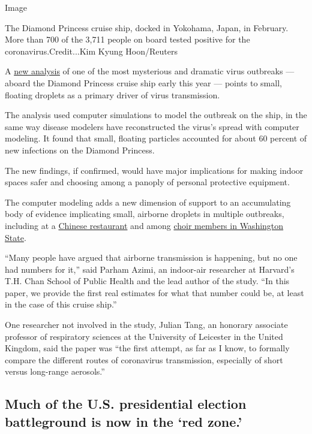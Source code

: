 Image

The Diamond Princess cruise ship, docked in Yokohama, Japan, in
February. More than 700 of the 3,711 people on board tested positive for
the coronavirus.Credit...Kim Kyung Hoon/Reuters

A
\href{https://www.medrxiv.org/content/10.1101/2020.07.13.20153049v1}{new
analysis} of one of the most mysterious and dramatic virus outbreaks ---
aboard the Diamond Princess cruise ship early this year --- points to
small, floating droplets as a primary driver of virus transmission.

The analysis used computer simulations to model the outbreak on the
ship, in the same way disease modelers have reconstructed the virus's
spread with computer modeling. It found that small, floating particles
accounted for about 60 percent of new infections on the Diamond
Princess.

The new findings, if confirmed, would have major implications for making
indoor spaces safer and choosing among a panoply of personal protective
equipment.

The computer modeling adds a new dimension of support to an accumulating
body of evidence implicating small, airborne droplets in multiple
outbreaks, including at a
\href{https://www.nytimes.com/2020/04/20/health/airflow-coronavirus-restaurants.html}{Chinese
restaurant} and among
\href{https://www.medrxiv.org/content/10.1101/2020.06.15.20132027v2}{choir
members in Washington State}.

``Many people have argued that airborne transmission is happening, but
no one had numbers for it,'' said Parham Azimi, an indoor-air researcher
at Harvard's T.H. Chan School of Public Health and the lead author of
the study. ``In this paper, we provide the first real estimates for what
that number could be, at least in the case of this cruise ship.''

One researcher not involved in the study, Julian Tang, an honorary
associate professor of respiratory sciences at the University of
Leicester in the United Kingdom, said the paper was ``the first attempt,
as far as I know, to formally compare the different routes of
coronavirus transmission, especially of short versus long-range
aerosols.''

\hypertarget{much-of-the-us-presidential-election-battleground-is-now-in-the-red-zone}{%
\subsection{Much of the U.S. presidential election battleground is now
in the `red
zone.'}\label{much-of-the-us-presidential-election-battleground-is-now-in-the-red-zone}}

